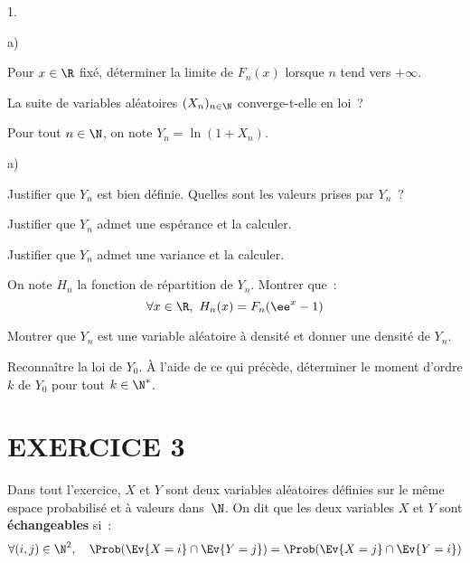 \begin{noliste}{1.}
\begin{noliste}{a)}
\item Pour $x \in \R$ fixé, déterminer la limite de $F_n(x)$  
lorsque $n$ tend vers $+\infty$.




\item La suite de variables aléatoires $(X_n)_{n \in \N}$ 
converge-t-elle en loi~?



\end{noliste}

\item Pour tout $n \in \N$, on note $Y_n = \ln(1+X_n)$.
\begin{noliste}{a)}
\item Justifier que $Y_n$ est bien définie. Quelles sont les valeurs 
prises par $Y_n$~?





\item Justifier que $Y_n$ admet une espérance et la calculer.




\item Justifier que $Y_n$ admet une variance et la calculer.

  


\item On note $H_n$ la fonction de répartition de $Y_n$. Montrer que~:
\[ 
\forall x \in \R, \ H_n(x) = F_n(\ee^x-1) 
\]




\item Montrer que $Y_n$ est une variable aléatoire à densité et donner
  une densité de $Y_n$.






\item Reconnaître la loi de $Y_0$. À l'aide de ce qui précède,
  déterminer le moment d'ordre $k$ de $Y_0$ pour tout $k \in \N^*$.

  
\end{noliste}
\end{noliste}


\newpage


\section*{EXERCICE 3}

\noindent
Dans tout l'exercice, $X$ et $Y$ sont deux variables aléatoires
définies sur le même espace probabilisé et à valeurs dans~$\N$. On dit
que les deux variables $X$ et $Y$ sont \textbf{échangeables} si~:
\[ 
\forall (i, j) \in \N^2, \quad \Prob(\Ev{X=i} \cap \Ev{Y=j}) = 
\Prob(\Ev{X=j} \cap \Ev{Y=i}) 
\]

